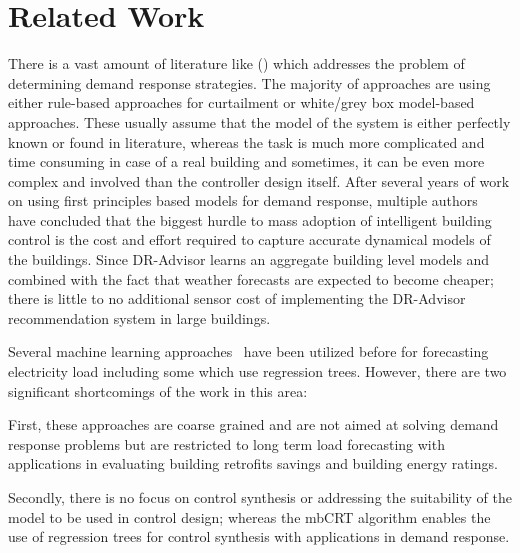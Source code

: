 \documentclass{sig-alternate-ipsn13}
\theoremstyle{definition}
\begin{document}
\section{Related Work}
\label{sec:related}
There is a vast amount of literature like (\cite{oldewurtel2013towards,xu2004peak}) which addresses the problem of determining demand response strategies. 
The majority of approaches are using either rule-based approaches for curtailment or white/grey box model-based approaches.
These usually assume that the model of the system is either perfectly known or found in literature, whereas the task is much more complicated and time consuming in case of a real building and sometimes, it can be even more complex and involved than the controller design itself.
After several years of work on using first principles based models for demand response, multiple authors~\cite{sturzeneggermodel, vzavcekova2014towards} have concluded that the biggest hurdle to mass adoption of intelligent building control is the cost and effort required to capture accurate dynamical models of the buildings.
Since DR-Advisor learns an aggregate building level models and combined with the fact that weather forecasts are expected to become cheaper; there is little to no additional sensor cost of implementing the DR-Advisor recommendation system in large buildings. %

Several machine learning approaches~\cite{edwards2012predicting, vaghefi2014modeling, yin2012scalable} have been utilized before for forecasting electricity load including some which use regression trees. 
However, there are two significant shortcomings of the work in this area: 
\begin{inparaenum}[(a)]
\item First, these approaches are coarse grained and  are not aimed at solving demand response problems but are restricted to long term load forecasting with applications in evaluating building retrofits savings and building energy ratings. 
\item Secondly, there is no focus on control synthesis or addressing the suitability of the model to be used in control design; whereas the mbCRT algorithm enables the use of regression trees for control synthesis with applications in demand response. 
\end{inparaenum}
\end{document}
